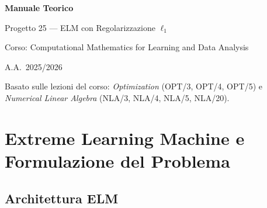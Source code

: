 \documentclass[11pt,a4paper]{article}
\theoremstyle{definition}
\theoremstyle{plain}
\theoremstyle{remark}
\begin{document}
\begin{titlepage}
  \centering
  \vspace*{3cm}
  {\LARGE\bfseries Manuale Teorico\par}
  \vspace{0.5cm}
  {\Large Progetto 25 --- ELM con Regolarizzazione $\ell_1$\par}
  \vspace{1cm}
  {\large Corso: Computational Mathematics for Learning and Data Analysis\par}
  \vspace{0.5cm}
  {\large A.A.\ 2025/2026\par}
  \vspace{3cm}
  \begin{abstract}
    Questo manuale raccoglie gli argomenti teorici necessari per lo sviluppo e la comprensione
    del \textbf{Progetto 25} del corso CM.
    Il progetto riguarda il training di una \emph{Extreme Learning Machine} (ELM)
    con regolarizzazione $\ell_1$ (LASSO), risolto tramite due algoritmi:
    \textbf{A1 = IRLS} (Iteratively Reweighted Least Squares) e
    \textbf{A2 = Metodo del Sottogradiente Deflesso con Target Level}.
    Il documento è strutturato come percorso di studio progressivo: si parte dal
    problema di minimi quadrati lineari, si analizzano i solutori numerici
    (fattorizzazione di Cholesky e gradiente coniugato), si introducono convessità e
    ottimalità per funzioni non differenziabili, e infine si descrivono i due algoritmi.
  \end{abstract}
  \vfill
  {\small Basato sulle lezioni del corso:
  \emph{Optimization} (OPT/3, OPT/4, OPT/5) e
  \emph{Numerical Linear Algebra} (NLA/3, NLA/4, NLA/5, NLA/20).}
\end{titlepage}

\tableofcontents
\newpage

\section{Extreme Learning Machine e Formulazione del Problema}
\label{sec:elm}

\subsection{Architettura ELM}
\end{document}
